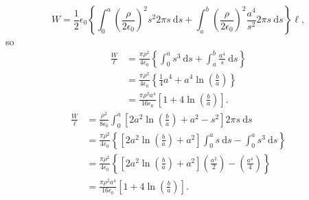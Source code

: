 \documentclass[12pt]{article}
\begin{document}
\[
W=\frac{1}{2} \epsilon_0\left\{\int_0^a\left(\frac{\rho}{2 \epsilon_0}\right)^2 s^2 2 \pi s \mathrm{~d} s+\int_a^b\left(\frac{\rho}{2 \epsilon_0}\right)^2 \frac{a^4}{s^2} 2 \pi s \mathrm{~d} s\right\} \ell,
\]
so
\[
\begin{aligned}
\frac{W}{\ell} & =\frac{\pi \rho^2}{4 \epsilon_0}\left\{\int_0^a s^3 \mathrm{~d} s+\int_a^b \frac{a^4}{s} \mathrm{~d} s\right\} \\
& =\frac{\pi \rho^2}{4 \epsilon_0}\left\{\frac{1}{4} a^4+a^4 \ln \left(\frac{b}{a}\right)\right\} \\
& =\frac{\pi \rho^2 a^4}{16 \epsilon_0}\left[1+4 \ln \left(\frac{b}{a}\right)\right] .
\end{aligned}
\]
\[
\begin{aligned}
\frac{W}{\ell} & =\frac{\rho^2}{8 \epsilon_0} \int_0^a\left[2 a^2 \ln \left(\frac{b}{a}\right)+a^2-s^2\right] 2 \pi s \mathrm{~d} s \\
& =\frac{\pi \rho^2}{4 \epsilon_0}\left\{\left[2 a^2 \ln \left(\frac{b}{a}\right)+a^2\right] \int_0^a s \mathrm{~d} s-\int_0^a s^3 \mathrm{~d} s\right\} \\
& =\frac{\pi \rho^2}{4 \epsilon_0}\left\{\left[2 a^2 \ln \left(\frac{b}{a}\right)+a^2\right]\left(\frac{a^2}{2}\right)-\left(\frac{a^4}{4}\right)\right\} \\
& =\frac{\pi \rho^2 a^4}{16 \epsilon_0}\left[1+4 \ln \left(\frac{b}{a}\right)\right] .
\end{aligned}
\]
\end{document}
